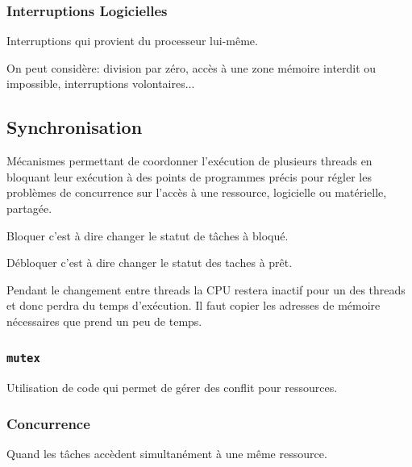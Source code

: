 \documentclass{article}
\begin{document}
\subsubsection{Interruptions Logicielles}
\begin{definition}
    Interruptions qui provient du processeur lui-même.

    \begin{example}
        On peut considère: division par zéro, accès à une zone mémoire interdit ou impossible, interruptions volontaires...
    \end{example}
\end{definition}



\subsection{Synchronisation}
\begin{definition}\label{def:synchronisation}
    Mécanismes permettant de coordonner l'exécution de plusieurs threads en bloquant leur exécution à des points de programmes précis pour régler les problèmes de concurrence sur l'accès à une ressource, logicielle ou matérielle, partagée.

    \begin{remark}
        Bloquer c'est à dire changer le statut de tâches à bloqué.
    \end{remark}
    \begin{remark}
        Débloquer c'est à dire changer le statut des taches à prêt.
    \end{remark}

    Pendant le changement entre threads la CPU restera inactif pour un des threads et donc perdra du temps d'exécution. Il faut copier les adresses de mémoire nécessaires que prend un peu de temps.
\end{definition}

\subsubsection{\texttt{mutex}}
\begin{definition}\label{def:mutex}
    Utilisation de code qui permet de gérer des conflit pour ressources. 
\end{definition}

\subsubsection{Concurrence}
\begin{definition}\label{def:concurrence}
    Quand les tâches accèdent simultanément à une même ressource.
\end{definition}
\end{document}
